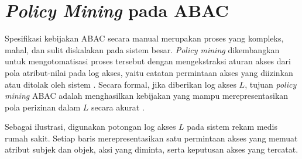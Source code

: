 \section{\textit{Policy Mining} pada ABAC}

Spesifikasi kebijakan ABAC secara manual merupakan proses yang kompleks, mahal, dan sulit diskalakan pada sistem besar.
\textit{Policy mining} dikembangkan untuk mengotomatisasi proses tersebut dengan mengekstraksi aturan akses dari pola atribut-nilai pada log akses, yaitu catatan permintaan akses yang diizinkan atau ditolak oleh sistem \parencite{perez-haro_abac_2024}.
Secara formal, jika diberikan log akses $L$\label{first:symbol-l}, tujuan \textit{policy mining} ABAC adalah menghasilkan kebijakan yang mampu merepresentasikan pola perizinan dalam $L$ secara akurat \parencite{diaz-rodriguez_abac_2025}.

Sebagai ilustrasi, digunakan potongan log akses $L$ pada sistem rekam medis rumah sakit.
Setiap baris merepresentasikan satu permintaan akses yang memuat atribut subjek dan objek, aksi yang diminta, serta keputusan akses yang tercatat.

